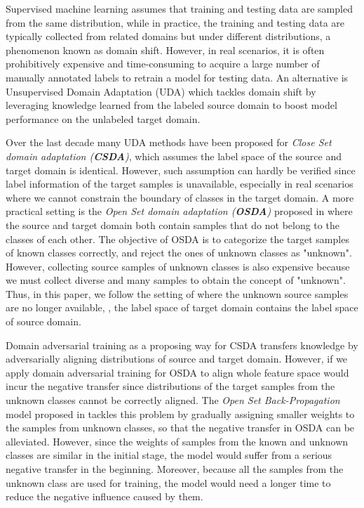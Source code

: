 Supervised machine learning assumes that training and testing data are sampled from the same distribution, while in practice, the training and testing data are typically collected from related domains but under different distributions, a phenomenon known as domain shift.
However, in real scenarios, it is often prohibitively expensive and time-consuming to acquire a large number of manually annotated labels to retrain a  model for testing data.
An alternative is Unsupervised Domain Adaptation (UDA) \cite{ben2010theory,TransferLearningSurvey} which tackles domain shift by leveraging knowledge learned from the labeled source domain to boost model performance on the unlabeled target domain.



Over the last decade many UDA methods \cite{DeepDomainConfusion,long2015learning,long2016unsupervised,tao2014sparsity,DomainAdversrialNetwork,liu2018coupled} have been proposed for \textit{Close Set domain adaptation (\textbf{CSDA})}, which assumes the label space of the source and target domain is identical.
However, such assumption can hardly be verified since label information of the target samples is unavailable, especially in real scenarios where we cannot constrain the boundary of classes in the target domain.
A more practical setting is the \textit{Open Set domain adaptation (\textbf{OSDA})}  proposed in \cite{OpensetsDA} where the source and target domain both contain samples that do not belong to the classes of each other.
The objective of OSDA is to categorize the target samples of known classes correctly, and reject the ones of unknown classes as "unknown".
However, collecting source samples of unknown classes is also expensive because we must collect diverse and many samples to obtain the concept of "unknown".
Thus, in this paper, we follow the setting of \cite{OpensetDA-bp} where the unknown source samples are no longer available, , the label space of target domain contains the label space of source domain.

Domain adversarial training as a proposing way for CSDA transfers knowledge by adversarially aligning distributions of source and target domain.
However, if we apply domain adversarial training for OSDA to align whole feature space would incur the negative transfer since distributions of the target samples from the unknown classes cannot be correctly aligned.
The \textit{Open Set Back-Propagation } model proposed in \cite{OpensetDA-bp} tackles this problem by gradually assigning smaller weights to the samples from unknown classes, so that the negative transfer in OSDA can be alleviated.
However, since the weights of samples from the known and unknown classes are similar in the initial stage, the model would suffer from a serious negative transfer in the beginning.
Moreover, because all the samples from the unknown class are used for training, the model would need a longer time to reduce the negative influence caused by them.

